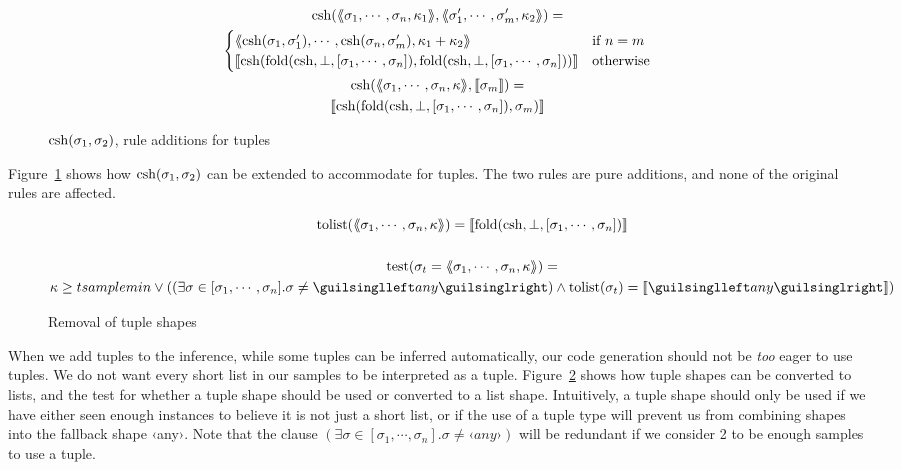 \begin{figure}[ht!]
\begin{gather*}
\operatorname{csh}(\langle\kern-0.25em\langle  \sigma_1, \cdots, \sigma_n, \kappa_1  \rangle\kern-0.25em\rangle, \langle\kern-0.25em\langle  \sigma'_1, \cdots, \sigma'_m, \kappa_2  \rangle\kern-0.25em\rangle) = \\
\begin{cases}
  \langle\kern-0.25em\langle  \operatorname{csh}(\sigma_1, \sigma'_1), \cdots, \operatorname{csh}(\sigma_n, \sigma'_m), \kappa_1 + \kappa_2  \rangle\kern-0.25em\rangle   &  \text{if } n = m \\
  \llbracket  \operatorname{csh}(\operatorname{fold}(\operatorname{csh}, \bot, [\sigma_1, \cdots, \sigma_n]), \operatorname{fold}(\operatorname{csh}, \bot, [\sigma_1, \cdots, \sigma_n]))  \rrbracket & \text{otherwise}
\end{cases} \\
\operatorname{csh}(\langle\kern-0.25em\langle  \sigma_1, \cdots, \sigma_n, \kappa  \rangle\kern-0.25em\rangle, \llbracket \sigma_m \rrbracket) = \\
\llbracket \operatorname{csh}(\operatorname{fold}(\operatorname{csh}, \bot, [\sigma_1, \cdots, \sigma_n]), \sigma_m) \rrbracket
\end{gather*}
\caption{$\operatorname{csh}(\sigma_1, \sigma_2)$, rule additions for tuples}
\label{fig:csh-tuple}
\end{figure}

Figure~\ref{fig:csh-tuple} shows how $\operatorname{csh}(\sigma_1, \sigma_2)$ can be extended to accommodate for tuples. The two rules are pure additions, and none of the original rules are affected.


\begin{figure}[ht!]
\begin{gather*}
\text{tolist}(\tupl{ \sigma_1, \cdots, \sigma_n, \kappa }) = \vect{\fold(\csh, \bot, [\sigma_1, \cdots, \sigma_n])} \\ \\
\text{test}(\sigma_t = \tupl{ \sigma_1, \cdots, \sigma_n, \kappa })  = \\
\kappa \geq tsamplemin \lor ((\exists \sigma \in [\sigma_1, \cdots, \sigma_n] . \sigma \neq ‹any›) \land \text{tolist}(\sigma_t) = \vect{‹any›})
\end{gather*}
\caption{Removal of tuple shapes}
\label{fig:remove-tuple}
\end{figure}

When we add tuples to the inference, while some tuples can be inferred automatically, our code generation should not be \emph{too} eager to use tuples. We do not want every short list in our samples to be interpreted as a tuple. Figure~\ref{fig:remove-tuple} shows how tuple shapes can be converted to lists, and the test for whether a tuple shape should be used or converted to a list shape. Intuitively, a tuple shape should only be used if we have either seen enough instances to believe it is not just a short list, or if the use of a tuple type will prevent us from combining shapes into the fallback shape ‹any›. Note that the clause $(\exists \sigma \in [\sigma_1, \cdots, \sigma_n] . \sigma \neq ‹any›)$ will be redundant if we consider 2 to be enough samples to use a tuple.

